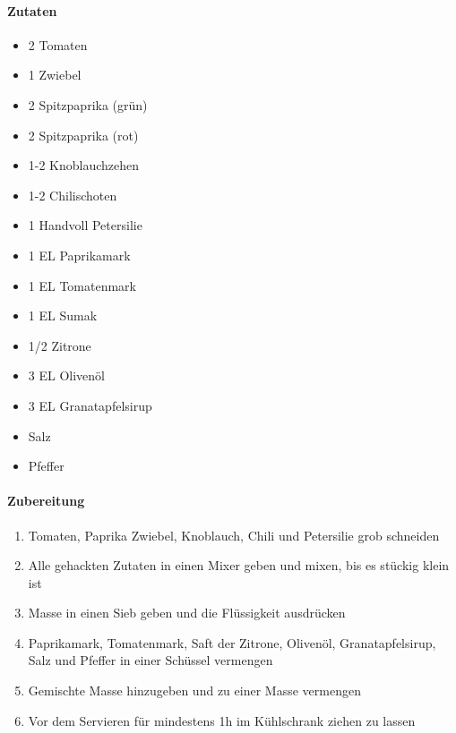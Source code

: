 \clearpage
{}

\paragraph{Zutaten}
\begin{itemize}[noitemsep]
	\item 2 Tomaten
	\item 1 Zwiebel
	\item 2 Spitzpaprika (grün)
	\item 2 Spitzpaprika (rot)
	\item 1-2 Knoblauchzehen 
	\item 1-2 Chilischoten
	\item 1 Handvoll Petersilie
	\item 1 EL Paprikamark
	\item 1 EL Tomatenmark
	\item 1 EL Sumak
	\item 1/2 Zitrone 
	\item 3 EL Olivenöl
	\item 3 EL Granatapfelsirup
	\item Salz
	\item Pfeffer
\end{itemize}

\paragraph{Zubereitung}
\begin{enumerate}[noitemsep]
	\item Tomaten, Paprika Zwiebel, Knoblauch, Chili und Petersilie grob schneiden
	\item Alle gehackten Zutaten in einen Mixer geben und mixen, bis es stückig klein ist
	\item Masse in einen Sieb geben und die Flüssigkeit ausdrücken
	\item Paprikamark, Tomatenmark, Saft der Zitrone, Olivenöl, Granatapfelsirup, Salz und Pfeffer in einer Schüssel vermengen
	\item Gemischte Masse hinzugeben und zu einer Masse vermengen
	\item Vor dem Servieren für mindestens 1h im Kühlschrank ziehen zu lassen
\end{enumerate}